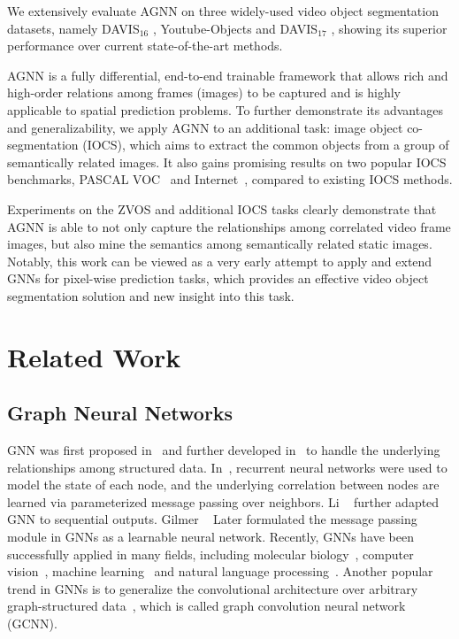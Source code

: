 \documentclass[10pt,twocolumn,letterpaper]{article}
\begin{document}
We extensively evaluate AGNN on three widely-used video object segmentation datasets, namely DAVIS$_{16}$ \cite{perazzi2016benchmark}, Youtube-Objects \cite{DBLP:conf/cvpr/PrestLCSF12} and DAVIS$_{17}$ \cite{pont20172017}, showing its superior performance over current state-of-the-art methods.

AGNN is a fully differential, end-to-end trainable framework that allows rich and high-order relations among frames (images) to be captured  and is highly applicable to spatial prediction problems. To further demonstrate its advantages and generalizability, we apply AGNN to an additional task:
image object co-segmentation (IOCS), which aims to extract the common objects from a group of semantically related images. It also gains promising results on two popular IOCS benchmarks, PASCAL VOC~\cite{pascal-voc-2012} and Internet~\cite{Rubinstein_2013_CVPR}, compared to existing IOCS methods.

Experiments on the ZVOS and additional IOCS tasks clearly demonstrate that AGNN is able to not only capture the relationships among correlated video frame images, but also mine the semantics among semantically related static images. Notably, this work can be viewed as a very early attempt to apply and extend GNNs for pixel-wise prediction tasks, which provides an effective video object segmentation solution and new insight into this task. \vspace*{-5pt}
\section{Related Work}
	\vspace*{-4pt}	
\subsection{Graph Neural Networks}
	\vspace*{-4pt}	
\label{sec:gnn}
GNN was first proposed in~\cite{gori2005new} and further developed in~\cite{scarselli2009graph} to handle the underlying relationships among structured data. In~\cite{scarselli2009graph}, recurrent neural networks were used to model the state of each node, and the underlying correlation between nodes are learned via parameterized message passing over neighbors. Li \etal~\cite{li2015gated} further adapted GNN to sequential outputs. Gilmer \etal~\cite{gilmer2017neural} Later formulated the message passing module in GNNs as a learnable neural network. Recently, GNNs have been successfully applied in many fields, including molecular biology~\cite{gilmer2017neural}, computer vision~\cite{Qi_2018_ECCV,Wang_2018_ECCV,zheng2019reasoning}, machine learning~\cite{velickovic2017graph} and natural language processing~\cite{beck2018graph}. Another popular trend in GNNs is to generalize the convolutional architecture over arbitrary graph-structured data~\cite{duvenaud2015convolutional,niepert2016learning,kipf2016semi}, which is called graph convolution neural network (GCNN). 
\end{document}
